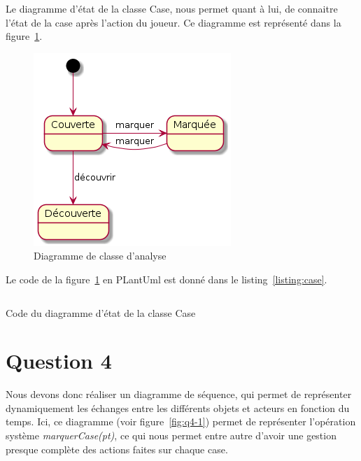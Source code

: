 \documentclass[a4paper,12pt]{article}
\begin{document}
Le diagramme d'état de la classe Case, nous permet quant à lui, de connaitre l'état de la case après l'action du joueur.
Ce diagramme est représenté dans la figure~\ref{fig:case}.

\begin{figure}[htbp]
    \centering
    \includegraphics[width=.5\textwidth]{./images/q3-Case.png}
    \caption{Diagramme de classe d'analyse}
    \label{fig:case}
\end{figure}


Le code de la figure~\ref{fig:case} en PLantUml est donné dans le listing~\ref{listing:case}.

\begin{listing}[ht]
    \inputminted[bgcolor=lightgray!40,linenos=true]{fsharp}{./code-images/q3-Case}
    \caption{Code du diagramme d'état de la classe Case}
    \label{listing:case}
\end{listing}

\clearpage

\section{Question 4}\label{question-4}

Nous devons donc réaliser un diagramme de séquence, qui permet de représenter dynamiquement les échanges entre les différents objets et acteurs en fonction du temps.
Ici, ce diagramme (voir figure~\ref{fig:q4-1}) permet de représenter l'opération système \emph{marquerCase(pt)}, ce qui nous permet entre autre d'avoir une gestion presque complète des actions faites sur chaque case.
\end{document}
